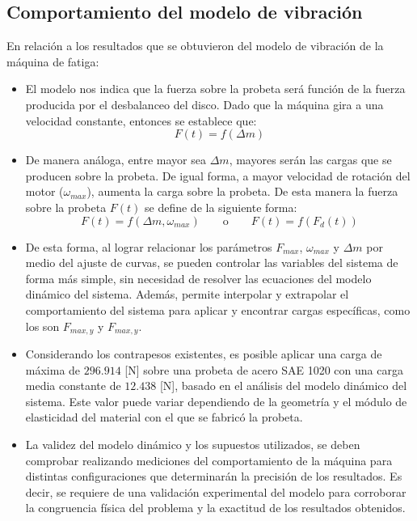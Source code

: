 \subsection{Comportamiento del modelo de vibración}
En relación a los resultados que se obtuvieron del modelo de vibración de la máquina de fatiga:
\begin{itemize}
	\item El modelo nos indica que la fuerza sobre la probeta será función de la fuerza producida por el desbalanceo del disco. Dado que la máquina gira a una velocidad constante, entonces se establece que:
	\begin{equation*}
		F(t) = f(\Delta m)
	\end{equation*}
	\item De manera análoga, entre mayor sea $\Delta m$, mayores serán las cargas que se producen sobre la probeta. De igual forma, a mayor velocidad de rotación del motor ($\omega_{max}$), aumenta la carga sobre la probeta. De esta manera la fuerza sobre la probeta $F(t)$ se define de la siguiente forma:
	\begin{equation*}
		F(t) = f (\Delta m, \omega_{max}) \qquad \text{o} \qquad F(t) = f(F_d(t))
	\end{equation*}
	\item De esta forma, al lograr relacionar los parámetros $F_{max}$, $\omega_{max}$ y $\Delta m$ por medio del ajuste de curvas, se pueden controlar las variables del sistema de forma más simple, sin necesidad de resolver las ecuaciones del modelo dinámico del sistema. Además, permite interpolar y extrapolar el comportamiento del sistema para aplicar y encontrar cargas específicas, como los son $F_{max,y}$ y $F_{max,y}$.
	\item Considerando los contrapesos existentes, es posible aplicar una carga de máxima de $296.914$ [N] sobre una probeta de acero SAE 1020 con una carga media constante de $12.438$ [N], basado en el análisis del modelo dinámico del sistema. Este valor puede variar dependiendo de la geometría y el módulo de elasticidad del material con el que se fabricó la probeta.
	\item La validez del modelo dinámico y los supuestos utilizados, se deben comprobar realizando mediciones del comportamiento de la máquina para distintas configuraciones que determinarán la precisión de los resultados. Es decir, se requiere de una validación experimental del modelo para corroborar la congruencia física del problema y la exactitud de los resultados obtenidos.
\end{itemize}

